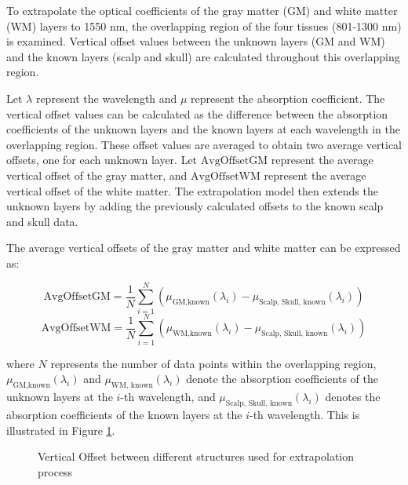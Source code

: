 \documentclass[journal,twoside,web]{ieeecolor}
\begin{document}
To extrapolate the optical coefficients of the gray matter (GM) and white matter (WM) layers to 1550 nm, the overlapping region of the four tissues 
(801-1300 nm) is examined. Vertical offset values between the unknown layers (GM and WM) and the known layers (scalp and skull) are calculated throughout 
this overlapping region.

Let \( \lambda \) represent the wavelength and \( \mu \) represent the absorption coefficient. The vertical offset values can be calculated as the difference 
between the absorption coefficients of the unknown layers and the known layers at each wavelength in the overlapping region. These offset values are averaged 
to obtain two average vertical offsets, one for each unknown layer. Let \( \text{AvgOffsetGM} \) represent the average vertical offset of the gray matter, and 
\( \text{AvgOffsetWM} \) represent the average vertical offset of the white matter. The extrapolation model then extends the unknown layers by adding the 
previously calculated offsets to the known scalp and skull data.

The average vertical offsets of the gray matter and white matter can be expressed as:

$$
\text{AvgOffsetGM} = \frac{1}{N} \sum_{i=1}^{N} (\mu_{\text{GM,known}}(\lambda_i) - \mu_{\text{Scalp, Skull, known}}(\lambda_i))
$$
$$
\text{AvgOffsetWM} = \frac{1}{N} \sum_{i=1}^{N} (\mu_{\text{WM,known}}(\lambda_i) - \mu_{\text{Scalp, Skull, known}}(\lambda_i))
$$

where \( N \) represents the number of data points within the overlapping region, \( \mu_{\text{GM,known}}(\lambda_i) \) and \( \mu_{\text{WM, known}}(\lambda_i) \) 
denote the absorption coefficients of the unknown layers at the \( i \)-th wavelength, and \( \mu_{\text{Scalp, Skull, known}}(\lambda_i) \) denotes the absorption coefficients of the known layers at the \( i \)-th wavelength. This is illustrated in Figure \ref{fig:Overlap}.

\begin{figure}[!htb]
    \caption{\label{fig:Overlap} Vertical Offset between different structures used for extrapolation process}
\end{figure}
\end{document}
